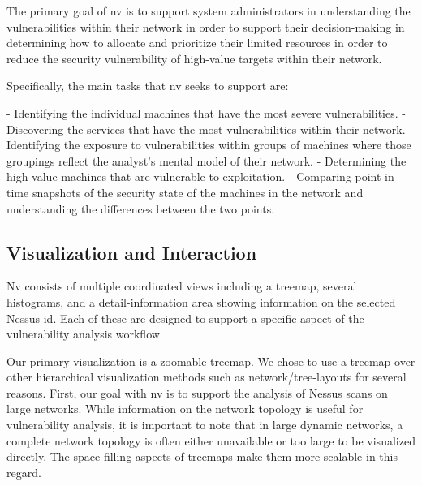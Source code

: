 \documentclass{acm_proc_article-sp}
\begin{document}
The primary goal of nv is to support system administrators in understanding the
vulnerabilities within their network in order to support their
decision-making in determining how to allocate and prioritize their
limited resources in order to reduce the security vulnerability of
high-value targets within their network.

Specifically, the main tasks that nv seeks to support are:

- Identifying the individual machines that have the most severe vulnerabilities.
- Discovering the services that have the most vulnerabilities within
their network.
- Identifying the exposure to vulnerabilities within groups of
machines where those groupings reflect the analyst's mental model of
their network.
- Determining the high-value machines that are vulnerable to exploitation.
- Comparing point-in-time snapshots of the security state of the
machines in the network and understanding the differences between the
two points.

\subsection{Visualization and Interaction}
Nv consists of multiple coordinated views including a treemap, several histograms, and a detail-information area showing information on the selected Nessus id.
Each of these are designed to support a specific aspect of the vulnerability analysis workflow

Our primary visualization is a zoomable treemap\cite{Shneiderman:1992:TVT:102377.115768}.
We chose to use a treemap over other hierarchical visualization methods such as network/tree-layouts for several reasons.
First, our goal with nv is to support the analysis of Nessus scans on large networks.
While information on the network topology is useful for vulnerability analysis, it is important to note that in large dynamic networks, a complete network topology is often either unavailable or too large to be visualized directly.
The space-filling aspects of treemaps make them more scalable in this regard.
\end{document}
